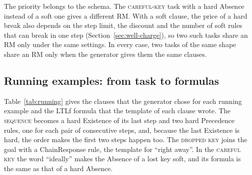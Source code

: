 \documentclass[11pt,english,listoffigures,listoftables]{tfgetsinf}
\newcommand{\runex}[1]{\textsc{#1}}  %
\begin{document}
The priority belongs to the schema. The \runex{careful-key} task with a hard Absence instead of a soft one gives a different RM. With a soft clause, the price of a hard break also depends on the step limit, the discount and the number of soft rules that can break in one step (Section~\ref{sec:well-charge}), so two such tasks share an RM only under the same settings. In every case, two tasks of the same shape share an RM only when the generator gives them the same clauses.

\subsection{Running examples: from task to formulas}
\label{sec:run-step1}
Table~\ref{tab:running} gives the clauses that the generator chose for each running example and the LTLf formula that the template of each clause wrote. The \runex{sequence} becomes a hard Existence of its last step and two hard Precedence rules, one for each pair of consecutive steps, and, because the last Existence is hard, the order makes the first two steps happen too. The \runex{dropped key} joins the goal with a ChainResponse rule, the template for ``right away''. In the \runex{careful key} the word ``ideally'' makes the Absence of a lost key soft, and its formula is the same as that of a hard Absence.
\end{document}
